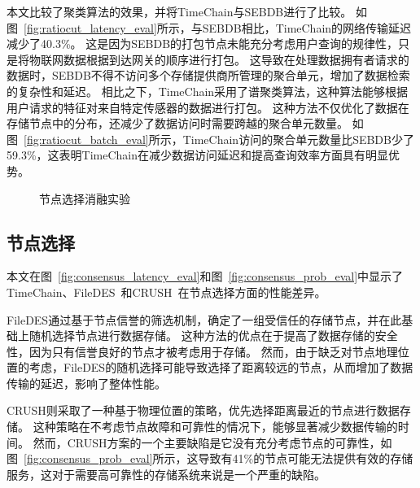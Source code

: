 本文比较了聚类算法的效果，并将TimeChain与SEBDB进行了比较。
如图~\autoref{fig:ratiocut_latency_eval}所示，与SEBDB相比，TimeChain的网络传输延迟减少了40.3\%。
这是因为SEBDB的打包节点未能充分考虑用户查询的规律性，只是将物联网数据根据到达网关的顺序进行打包。
这导致在处理数据拥有者请求的数据时，SEBDB不得不访问多个存储提供商所管理的聚合单元，增加了数据检索的复杂性和延迟。
相比之下，TimeChain采用了谱聚类算法，这种算法能够根据用户请求的特征对来自特定传感器的数据进行打包。
这种方法不仅优化了数据在存储节点中的分布，还减少了数据访问时需要跨越的聚合单元数量。
如图~\autoref{fig:ratiocut_batch_eval}所示，TimeChain访问的聚合单元数量比SEBDB少了59.3\%，这表明TimeChain在减少数据访问延迟和提高查询效率方面具有明显优势。

\begin{figure*}[t]
    \centering
    \begin{minipage}{0.9\linewidth}
        \quad
        \caption{节点选择消融实验} 
    \end{minipage}
\end{figure*}

\subsection{节点选择}
本文在图~\autoref{fig:consensus_latency_eval}和图~\autoref{fig:consensus_prob_eval}中显示了TimeChain、FileDES~\cite{xu2024filedes}和CRUSH~\cite{weil2006ceph}在节点选择方面的性能差异。

FileDES通过基于节点信誉的筛选机制，确定了一组受信任的存储节点，并在此基础上随机选择节点进行数据存储。
这种方法的优点在于提高了数据存储的安全性，因为只有信誉良好的节点才被考虑用于存储。
然而，由于缺乏对节点地理位置的考虑，FileDES的随机选择可能导致选择了距离较远的节点，从而增加了数据传输的延迟，影响了整体性能。

CRUSH则采取了一种基于物理位置的策略，优先选择距离最近的节点进行数据存储。
这种策略在不考虑节点故障和可靠性的情况下，能够显著减少数据传输的时间。
然而，CRUSH方案的一个主要缺陷是它没有充分考虑节点的可靠性，如图~\autoref{fig:consensus_prob_eval}所示，这导致有41\%的节点可能无法提供有效的存储服务，这对于需要高可靠性的存储系统来说是一个严重的缺陷。

